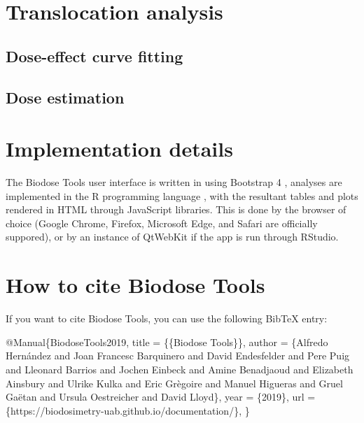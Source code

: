 \documentclass[]{scrartcl}
\newenvironment{Shaded}{\begin{snugshade}}{\end{snugshade}}
\newcommand{\NormalTok}[1]{#1}
\begin{document}
\hypertarget{stats-trans}{%
\section{Translocation analysis}\label{stats-trans}}

\hypertarget{dose-effect-curve-fitting-1}{%
\subsection{Dose-effect curve fitting}\label{dose-effect-curve-fitting-1}}

\hypertarget{dose-estimation-1}{%
\subsection{Dose estimation}\label{dose-estimation-1}}

\hypertarget{refs}{}

\hypertarget{appendix-appendices}{%
\appendix}


\hypertarget{app:implementation}{%
\section{Implementation details}\label{app:implementation}}

The Biodose Tools user interface is written in \citep{R-shiny} using Bootstrap 4 \citep{R-bs4Dash}, analyses are implemented in the R programming language \citep{R-base}, with the resultant tables and plots rendered in HTML through JavaScript libraries. This is done by the browser of choice (Google Chrome, Firefox, Microsoft Edge, and Safari are officially suppored), or by an instance of QtWebKit if the app is run through RStudio.

\hypertarget{how-to-cite-biodose-tools}{%
\section{How to cite Biodose Tools}\label{how-to-cite-biodose-tools}}

If you want to cite Biodose Tools, you can use the following BibTeX entry:

\begin{Shaded}
\begin{Highlighting}[]
\NormalTok{@Manual\{BiodoseTools2019,}
\NormalTok{  title = \{\{Biodose Tools\}\},}
\NormalTok{  author = \{Alfredo Hernández and Joan Francesc Barquinero and David Endesfelder and Pere Puig and Lleonard Barrios and Jochen Einbeck and Amine Benadjaoud and Elizabeth Ainsbury and Ulrike Kulka and Eric Grègoire and Manuel Higueras and Gruel Gaëtan and Ursula Oestreicher and David Lloyd\},}
\NormalTok{  year = \{2019\},}
\NormalTok{  url = \{https://biodosimetry-uab.github.io/documentation/\},}
\NormalTok{\}}
\end{Highlighting}
\end{Shaded}


\end{document}
